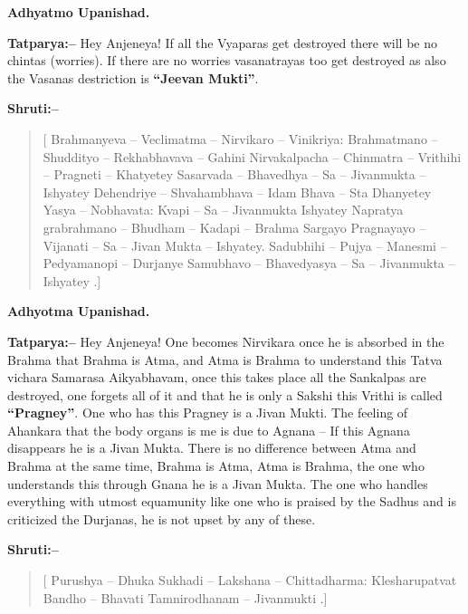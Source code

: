 \begin{flushright}
\textbf{Adhyatmo Upanishad.}
\end{flushright}

\textbf{Tatparya:–} Hey Anjeneya! If all the Vyaparas get destroyed there will be no chintas (worries). If there are no worries vasanatrayas too get destroyed as also the Vasanas destriction is \textbf{“Jeevan Mukti”}.

\textbf{Shruti:–}

\begin{verse}
[ Brahmanyeva – Veclimatma – Nirvikaro – Vinikriya:  Brahmatmano – Shuddityo – Rekhabhavava – Gahini  Nirvakalpacha – Chinmatra – Vrithihi – Pragneti – Khatyetey  Sasarvada – Bhavedhya – Sa – Jivanmukta – Ishyatey  Dehendriye – Shvahambhava – Idam Bhava – Sta Dhanyetey Yasya – Nobhavata: Kvapi – Sa – Jivanmukta Ishyatey  Napratya grabrahmano – Bhudham – Kadapi – Brahma Sargayo  Pragnayayo – Vijanati – Sa – Jivan Mukta – Ishyatey.  Sadubhihi – Pujya – Manesmi – Pedyamanopi – Durjanye  Samubhavo – Bhavedyasya – Sa – Jivanmukta – Ishyatey .]
\end{verse}

\begin{flushright}
\textbf{Adhyotma Upanishad.}
\end{flushright}

\textbf{Tatparya:–} Hey Anjeneya! One becomes Nirvikara once he is absorbed in the Brahma that Brahma is Atma, and Atma is Brahma to understand this Tatva vichara Samarasa Aikyabhavam, once this takes place all the Sankalpas are destroyed, one forgets all of it and that he is only a Sakshi this Vrithi is called \textbf{“Pragney”}. One who has this Pragney is a Jivan Mukti. The feeling of Ahankara that the body organs is me is due to Agnana – If this Agnana disappears he is a Jivan Mukta. There is no difference between Atma and Brahma at the same time, Brahma is Atma, Atma is Brahma, the one who understands this through Gnana he is a Jivan Mukta. The one who handles everything with utmost equamunity like one who is praised by the Sadhus and is criticized the Durjanas, he is not upset by any of these.

\textbf{Shruti:–}

\begin{verse}
[ Purushya – Dhuka Sukhadi – Lakshana – Chittadharma:  Klesharupatvat Bandho – Bhavati  Tamnirodhanam – Jivanmukti .]
\end{verse}


